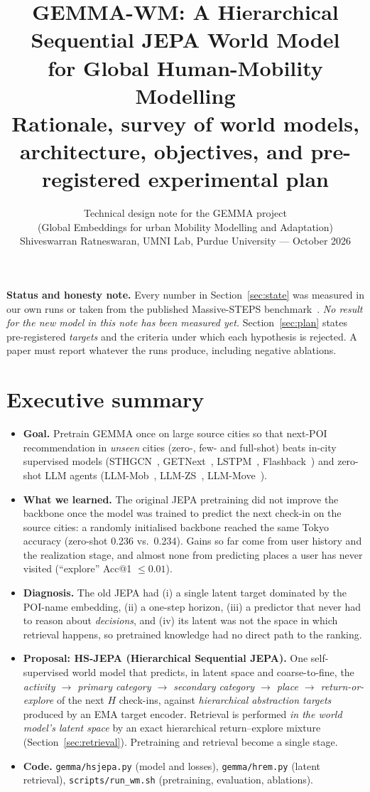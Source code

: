 \documentclass[10.5pt]{article}
\title{\textbf{GEMMA-WM: A Hierarchical Sequential JEPA World Model\\for Global Human-Mobility Modelling}\\[4pt]
\large Rationale, survey of world models, architecture, objectives, and pre-registered experimental plan}
\author{Technical design note for the GEMMA project\\(Global Embeddings for urban Mobility Modelling and Adaptation)\\[3pt]
Shiveswarran Ratneswaran, UMNI Lab, Purdue University --- October 2026}
\date{}
\begin{document}
\maketitle

\begin{note}
\textbf{Status and honesty note.} Every number in Section~\ref{sec:state} was measured in our own runs or taken from the
published Massive-STEPS benchmark~\cite{massivesteps}. \emph{No result for the new model in this note has been measured yet.}
Section~\ref{sec:plan} states pre-registered \emph{targets} and the criteria under which each hypothesis is rejected.
A paper must report whatever the runs produce, including negative ablations.
\end{note}

\section{Executive summary}
\begin{itemize}
\item \textbf{Goal.} Pretrain GEMMA once on large source cities so that next-POI recommendation in \emph{unseen} cities
(zero-, few- and full-shot) beats in-city supervised models (STHGCN~\cite{sthgcn}, GETNext~\cite{getnext},
LSTPM~\cite{lstpm}, Flashback~\cite{flashback}) and zero-shot LLM agents (LLM-Mob~\cite{llmmob}, LLM-ZS~\cite{llmzs},
LLM-Move~\cite{llmmove}).
\item \textbf{What we learned.} The original JEPA pretraining did not improve the backbone once the model was trained to
predict the next check-in on the source cities: a randomly initialised backbone reached the same Tokyo accuracy
(zero-shot 0.236 vs.\ 0.234). Gains so far come from user history and the realization stage, and almost none from
predicting places a user has never visited (``explore'' Acc@1 $\le 0.01$).
\item \textbf{Diagnosis.} The old JEPA had (i) a single latent target dominated by the POI-name embedding, (ii) a
one-step horizon, (iii) a predictor that never had to reason about \emph{decisions}, and (iv) its latent was not the
space in which retrieval happens, so pretrained knowledge had no direct path to the ranking.
\item \textbf{Proposal: HS-JEPA (Hierarchical Sequential JEPA).} One self-supervised world model that predicts, in
latent space and coarse-to-fine, the \emph{activity $\rightarrow$ primary category $\rightarrow$ secondary category
$\rightarrow$ place $\rightarrow$ return-or-explore} of the next $H$ check-ins, against \emph{hierarchical abstraction
targets} produced by an EMA target encoder. Retrieval is performed \emph{in the world model's latent space} by an exact
hierarchical return--explore mixture (Section~\ref{sec:retrieval}). Pretraining and retrieval become a single stage.
\item \textbf{Code.} \texttt{gemma/hsjepa.py} (model and losses), \texttt{gemma/hrem.py} (latent retrieval),
\texttt{scripts/run\_wm.sh} (pretraining, evaluation, ablations).
\end{itemize}
\end{document}
